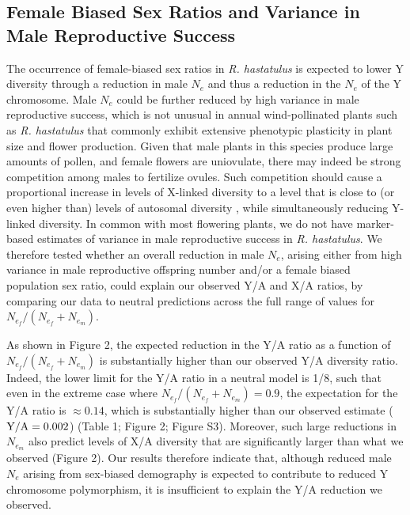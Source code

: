 \documentclass[9pt,twocolumn,twoside]{gsajnl}
\begin{document}
\subsection*{Female Biased Sex Ratios and Variance in Male Reproductive Success}
The occurrence of female-biased sex ratios in \textit{R. hastatulus} is expected to lower Y diversity through a reduction in male $N_{e}$ and thus a reduction in the $N_{e}$ of the Y chromosome. Male $N_{e}$ could be further reduced by high variance in male reproductive success, which is not unusual in annual wind-pollinated plants such as \textit{R. hastatulus} that commonly exhibit extensive phenotypic plasticity in plant size and flower production. Given that male plants in this species produce large amounts of pollen, and female flowers are uniovulate, there may indeed be strong competition among males to fertilize ovules. Such competition should cause a proportional increase in levels of X-linked diversity to a level that is close to (or even higher than) levels of autosomal diversity \citep{caballero1995}, while simultaneously reducing Y-linked diversity. In common with most flowering plants, we do not have marker-based estimates of variance in male reproductive success in \textit{R. hastatulus}. We therefore tested whether an overall reduction in male $N_{e}$, arising either from high variance in male reproductive offspring number and/or a female biased population sex ratio, could explain our observed Y/A and X/A ratios, by comparing our data to neutral predictions across the full range of values for $N_{e}_{f}/(N_{e}_{f} + N_{e}_{m})$.

As shown in Figure 2, the expected reduction in the Y/A ratio as a function of $N_{e}_{f}/(N_{e}_{f} + N_{e}_{m})$ is substantially higher than our observed Y/A diversity ratio. Indeed, the lower limit for the Y/A ratio in a neutral model is 1/8, such that even in the extreme case where $N_{e}_{f}/(N_{e}_{f} + N_{e}_{m}) = 0.9$, the expectation for the Y/A ratio is $\approx 0.14$, which is substantially higher than our observed estimate ($\textnormal{Y/A}=0.002$) (Table 1; Figure 2; Figure S3). Moreover, such large reductions in $N_{e}_{m}$ also predict levels of X/A diversity that are significantly larger than what we observed (Figure 2). Our results therefore indicate that, although reduced male $N_{e}$ arising from sex-biased demography is expected to contribute to reduced Y chromosome polymorphism, it is insufficient to explain the Y/A reduction we observed.
\end{document}

